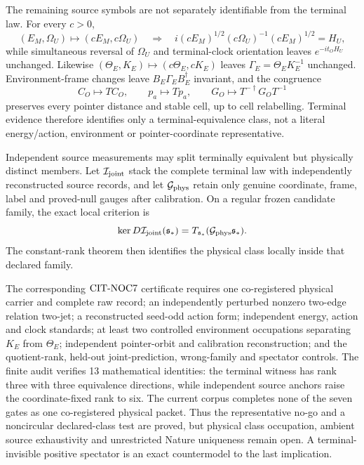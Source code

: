\documentclass[11pt]{article}
\begin{document}
The remaining source symbols are not separately identifiable from the
terminal law.  For every \(c>0\),
\begin{equation}
 (E_M,\Omega_U)\mapsto(cE_M,c\Omega_U)
 \quad\Longrightarrow\quad
 i(cE_M)^{1/2}(c\Omega_U)^{-1}(cE_M)^{1/2}=H_U,
 \label{eq:cit-common-unit-invariance}
\end{equation}
while simultaneous reversal of \(\Omega_U\) and terminal-clock orientation
leaves \(e^{-it_OH_U}\) unchanged.  Likewise
\((\Theta_E,K_E)\mapsto(c\Theta_E,cK_E)\) leaves
\(\Gamma_E=\Theta_EK_E^{-1}\) unchanged.  Environment-frame changes leave
\(B_E\Gamma_EB_E^\dagger\) invariant, and the congruence
\begin{equation}
 C_O\mapsto TC_O,\qquad p_a\mapsto Tp_a,\qquad
 G_O\mapsto T^{-\dagger}G_OT^{-1}
 \label{eq:cit-pointer-congruence}
\end{equation}
preserves every pointer distance and stable cell, up to cell relabelling.
Terminal evidence therefore identifies only a terminal-equivalence class,
not a literal energy/action, environment or pointer-coordinate
representative.

Independent source measurements may split terminally equivalent but
physically distinct members.  Let \({\cal I}_{\rm joint}\) stack the complete
terminal law with independently reconstructed source records, and let
\({\cal G}_{\rm phys}\) retain only genuine coordinate, frame, label and
proved-null gauges after calibration.  On a regular frozen candidate family,
the exact local criterion is
\begin{equation}
 \ker D{\cal I}_{\rm joint}(\mathfrak s_*)
 =T_{\mathfrak s_*}({\cal G}_{\rm phys}\mathfrak s_*).
 \label{eq:cit-quotient-rank}
\end{equation}
The constant-rank theorem then identifies the physical class locally inside
that declared family.

The corresponding \({\rm CIT\mbox{-}NOC7}\) certificate requires one
co-registered physical carrier and complete raw record; an independently
perturbed nonzero two-edge relation two-jet; a reconstructed seed-odd action
form; independent energy, action and clock standards; at least two controlled
environment occupations separating \(K_E\) from \(\Theta_E\); independent
pointer-orbit and calibration reconstruction; and the quotient-rank,
held-out joint-prediction, wrong-family and spectator controls.  The finite
audit verifies 13 mathematical identities: the terminal witness has rank
three with three equivalence directions, while independent source anchors
raise the coordinate-fixed rank to six.  The current corpus completes none
of the seven gates as one co-registered physical packet.  Thus the
representative no-go and a noncircular declared-class test are proved, but
physical class occupation, ambient source exhaustivity and unrestricted
Nature uniqueness remain open.  A terminal-invisible positive spectator is
an exact countermodel to the last implication.
\end{document}
